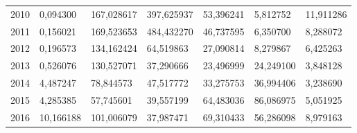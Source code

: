 \begin{table}
\begin{tabular}{p{1cm}p{2cm}p{2cm}p{2cm}p{2cm}p{2cm}p{2cm}}
 2010 &                                  0,094300 &               167,028617 &                397,625937 &  53,396241 &                            5,812752 &                    11,911286 \\
 2011 &                                  0,156021 &               169,523653 &                484,432270 &  46,737595 &                            6,350700 &                     8,288072 \\
 2012 &                                  0,196573 &               134,162424 &                 64,519863 &  27,090814 &                            8,279867 &                     6,425263 \\
 2013 &                                  0,526076 &               130,527071 &                 37,290666 &  23,496999 &                           24,249100 &                     3,848128 \\
 2014 &                                  4,487247 &                78,844573 &                 47,517772 &  33,275753 &                           36,994406 &                     3,238690 \\
 2015 &                                  4,285385 &                57,745601 &                 39,557199 &  64,483036 &                           86,086975 &                     5,051925 \\
 2016 &                                 10,166188 &               101,006079 &                 37,987471 &  69,310433 &                           56,286098 &                     8,979163 \\
\bottomrule
\end{tabular}
\end{table}

